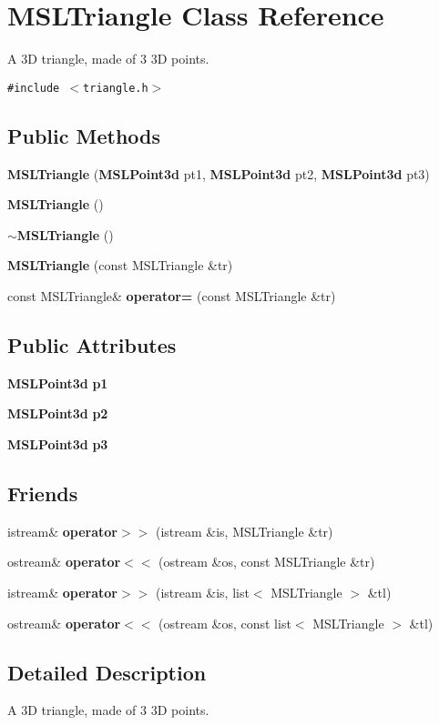 \section{MSLTriangle  Class Reference}
\label{class_MSLTriangle}
A 3D triangle, made of 3 3D points. 


{\tt \#include $<$triangle.h$>$}

\subsection*{Public Methods}
\begin{CompactItemize}
\item 
{\bf MSLTriangle} ({\bf MSLPoint3d} pt1, {\bf MSLPoint3d} pt2, {\bf MSLPoint3d} pt3)
\item 
{\bf MSLTriangle} ()
\item 
{\bf $\sim$MSLTriangle} ()
\item 
{\bf MSLTriangle} (const MSLTriangle \&tr)
\item 
const MSLTriangle\& {\bf operator=} (const MSLTriangle \&tr)
\end{CompactItemize}
\subsection*{Public Attributes}
\begin{CompactItemize}
\item 
{\bf MSLPoint3d} {\bf p1}
\item 
{\bf MSLPoint3d} {\bf p2}
\item 
{\bf MSLPoint3d} {\bf p3}
\end{CompactItemize}
\subsection*{Friends}
\begin{CompactItemize}
\item 
istream\& {\bf operator$>$$>$} (istream \&is, MSLTriangle \&tr)
\item 
ostream\& {\bf operator$<$$<$} (ostream \&os, const MSLTriangle \&tr)
\item 
istream\& {\bf operator$>$$>$} (istream \&is, list$<$ MSLTriangle $>$ \&tl)
\item 
ostream\& {\bf operator$<$$<$} (ostream \&os, const list$<$ MSLTriangle $>$ \&tl)
\end{CompactItemize}


\subsection{Detailed Description}
A 3D triangle, made of 3 3D points.



